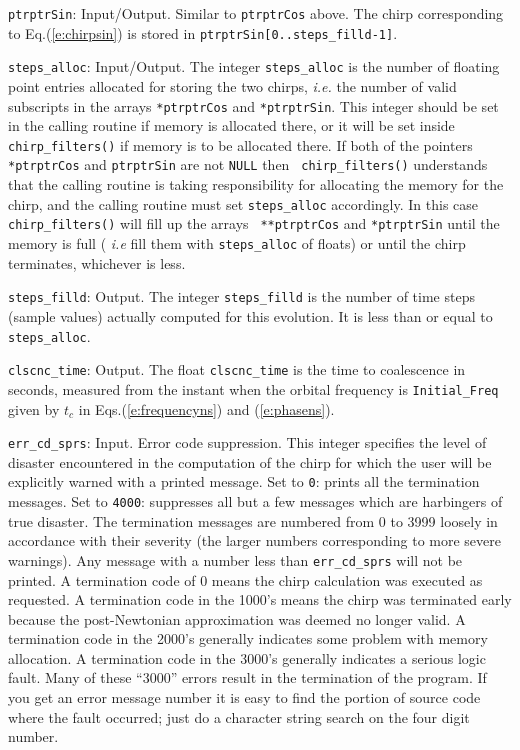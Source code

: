 \begin{description}
\item{\tt ptrptrSin}: Input/Output. Similar to {\tt ptrptrCos} above.
  The chirp corresponding to Eq.(\ref{e:chirpsin}) is stored in
  {\tt *ptrptrSin[0..steps\_filld-1]}.
\item{\tt steps\_alloc}: Input/Output. The integer
  {\tt *steps\_alloc} is the number of floating point entries allocated
  for storing the two chirps, {\it i.e.} the number of valid
  subscripts in the arrays {\tt **ptrptrCos} and {\tt **ptrptrSin}.
  This integer should be set in the calling routine if memory is
  allocated there, or it will be set inside {\tt  chirp\_filters()} if
  memory is to be allocated there.  If both of the pointers {\tt
  *ptrptrCos} and {\tt *ptrptrSin} are not {\tt NULL} then {\tt
  chirp\_filters()} understands that the calling routine is taking
  responsibility for allocating the memory for the chirp, and the
  calling routine must set {\tt *steps\_alloc} accordingly.  In this
  case {\tt chirp\_filters()} will fill up the arrays  {\tt
  **ptrptrCos} and {\tt **ptrptrSin} until the memory is full ({\it
  i.e} fill them with {\tt *steps\_alloc} of floats) or until the chirp
  terminates, whichever is less.
\item{\tt steps\_filld}: Output. The integer {\tt *steps\_filld}
  is the number of time steps (sample values) actually computed
  for this evolution. It is less than or equal to {\tt *steps\_alloc}.
\item{\tt clscnc\_time}: Output. The float {\tt *clscnc\_time}
 is the time to coalescence in seconds,
 measured from the instant when the orbital frequency is 
 {\tt Initial\_Freq} given by $t_c$ in Eqs.(\ref{e:frequencyns})
 and (\ref{e:phasens}).
\item{\tt err\_cd\_sprs}: Input. 
 Error code suppression.  This integer specifies the level of disaster
 encountered in the computation of the chirp for which the user will be
 explicitly warned with a printed message.  Set to {\tt 0}: prints
 all the termination messages. Set to {\tt 4000}: suppresses
 all but a few messages which are  harbingers of true disaster.  The
 termination messages are numbered from 0 to 3999 loosely in accordance
 with their severity (the larger numbers corresponding to more severe
 warnings).  Any message with a number less than {\tt err\_cd\_sprs}
 will not be printed.  A termination code of 0 means the chirp
 calculation was executed as requested.  A termination code in the
 1000's means the chirp was terminated early because the post-Newtonian
 approximation was deemed no longer valid.  A termination code in the
 2000's generally indicates some problem with memory allocation.  A
 termination code in the 3000's generally indicates a serious logic
 fault.  Many of these ``3000'' errors result in the termination of the
 program.  If you get an error message number it is easy to find the
 portion of source code where the fault occurred; just do a character
 string search on the four digit number.
\end{description}
